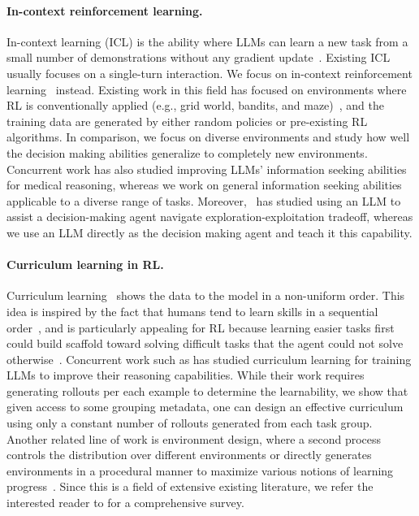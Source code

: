 \paragraph{In-context reinforcement learning.} In-context learning (ICL) is the ability where LLMs can learn a new task from a small number of demonstrations without any gradient update~\citep{brown2020language}. Existing ICL usually focuses on a single-turn interaction. We focus on in-context reinforcement learning~\citep{laskin2022context, raparthy2023generalization, lee2024supervised, lin2024transformers} instead. Existing work in this field has focused on environments where RL is conventionally applied (e.g., grid world, bandits, and maze)~\citep{monea2025llmsincontextbanditreinforcement}, and the training data are generated by either random policies or pre-existing RL algorithms. In comparison, we focus on diverse environments and study how well the decision making abilities generalize to completely new environments. Concurrent work has also studied improving LLMs' information seeking abilities~\citep{li2025aligningllmsaskgood} for medical reasoning, whereas we work on general information seeking abilities applicable to a diverse range of tasks. Moreover,~\citet{harris2025uselargelanguagemodel} has studied using an LLM to assist a decision-making agent navigate exploration-exploitation tradeoff, whereas we use an LLM directly as the decision making agent and teach it this capability.

\paragraph{Curriculum learning in RL.}
Curriculum learning~\citep{bengio2009curriculum} shows the data to the model in a non-uniform order. This idea is inspired by the fact that humans tend to learn skills in a sequential order~\citep{skinner1958reinforcement}, and is particularly appealing for RL because learning easier tasks first could build scaffold toward solving difficult tasks that the agent could not solve otherwise~\citep{andrychowicz2017hindsight, florensa2017reverse, fang2019curriculum, portelas2020teacher}. Concurrent work such as \citet{foster2025learningreasonfrontierlearnability} has studied curriculum learning for training LLMs to improve their reasoning capabilities. While their work requires generating rollouts per each example to determine the learnability, we show that given access to some grouping metadata, one can design an effective curriculum using only a constant number of rollouts generated from each task group.
Another related line of work is environment design, where a second process controls the distribution over different environments or directly generates environments in a procedural manner to maximize various notions of learning progress~\citep{wang2019paired, dennis2020emergent, jiang2021prioritized, jiang2021replay, bruce2024genie}.
Since this is a field of extensive existing literature, we refer the interested reader to \citet{portelas2020automatic} for a comprehensive survey.
